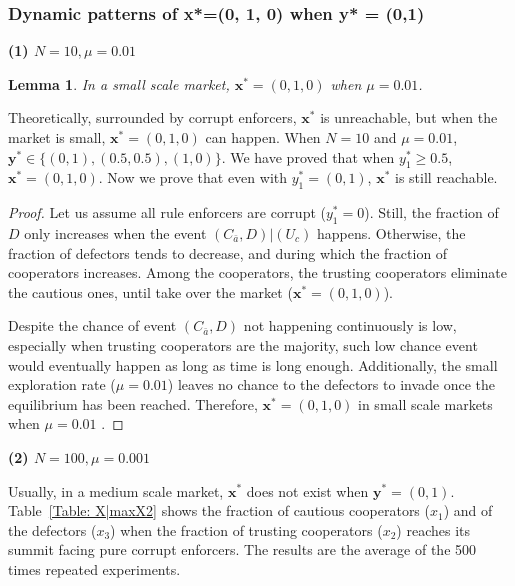 \documentclass[letterpaper,10pt]{article}
\numberwithin{equation}{section}
\newtheorem{lemma}[theorem]{Lemma}
\begin{document}
\subsubsection{Dynamic patterns of x*=(0, 1, 0) when y* = (0,1)}\label{AppendixC22}
  
\textbf{(1) $ N = 10, \mu = 0.01 $}\label{AppendixC221}

\begin{lemma}
    In a small scale market, $ \mathbf{x}^* = (0,1,0) $ when $ \mu = 0.01 $.
\end{lemma}

Theoretically, surrounded by corrupt enforcers, $ \mathbf{x}^* $ is unreachable, but when the market is small, $ \mathbf{x}^* = (0,1,0) $ can happen. When $ N = 10 $ and $ \mu = 0.01 $, $ \mathbf{y}^* \in \{(0, 1), (0.5, 0.5), (1, 0)\} $. We have proved that when $ y_{1}^* \geq 0.5 $, $ \mathbf{x}^* = (0, 1, 0) $. Now we prove that even with $ y_{1}^* = (0, 1) $, $ \mathbf{x}^* $ is still reachable.

\begin{proof}
    Let us assume all rule enforcers are corrupt ($ y_{1}^* = 0 $). Still, the fraction of $ D $ only increases when the event $ (C_{\bar{a}}, D)|(U_{c}) $ happens. Otherwise, the fraction of defectors tends to decrease, and during which the fraction of cooperators increases. Among the cooperators, the trusting cooperators eliminate the cautious ones, until take over the market ($ \mathbf{x}^* = (0,1,0) $).
    
    Despite the chance of event $ (C_{\bar{a}}, D) $ not happening continuously is low, especially when trusting cooperators are the majority, such low chance event would eventually happen as long as time is long enough. Additionally, the small exploration rate ($ \mu = 0.01 $) leaves no chance to the defectors to invade once the equilibrium has been reached. Therefore, $ \mathbf{x}^* = (0, 1, 0) $ in small scale markets when $ \mu = 0.01 $ .
\end{proof}

\noindent
\textbf{(2) $ N = 100, \mu = 0.001 $}\label{AppendixC222}

Usually, in a medium scale market, $ \mathbf{x}^* $ does not exist when $ \mathbf{y}^* = (0, 1) $. Table~\ref{Table: X|maxX2} shows the fraction of cautious cooperators ($ x_{1} $) and of the defectors ($ x_{3} $) when the fraction of trusting cooperators ($ x_{2} $) reaches its summit facing pure corrupt enforcers. The results are the average of the 500 times repeated experiments.
\end{document}
